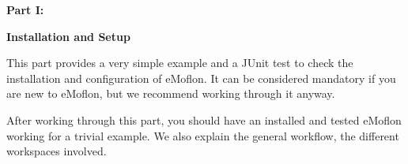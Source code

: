 {\bf \huge Part I:}
\vspace{0.7cm}
 
{\bf \Huge Installation and Setup }

\vspace{0.5cm}

This part provides a very simple example and a JUnit test to check the installation and configuration of eMoflon. It can be considered mandatory if you are new to eMoflon, but we recommend working through it anyway.

After working through this part, you should have an installed and tested eMoflon working for a trivial example. We also explain the general workflow, the different workspaces involved.

\downloadLocation{\dlPartOne}






